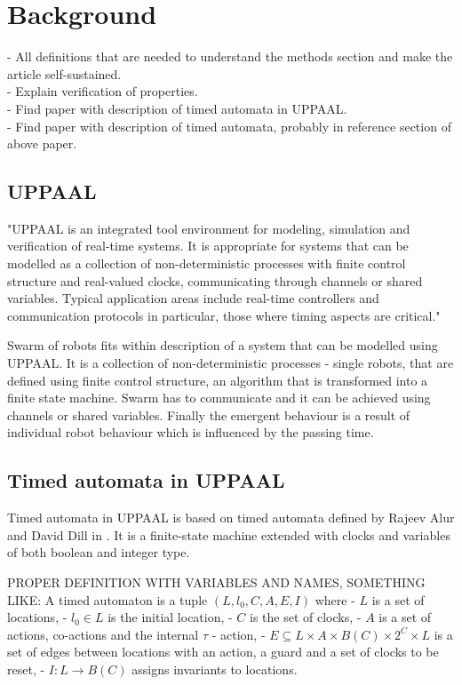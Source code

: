 \section{Background}
- All definitions that are needed to understand the methods section and make the article self-sustained. \\
- Explain verification of properties. \\
- Find paper with description of timed automata in UPPAAL. \\
- Find paper with description of timed automata, probably in reference section of above paper. \\

\subsection{UPPAAL}
"UPPAAL is an integrated tool environment for modeling, simulation and verification of real-time systems. It is appropriate for systems that can be modelled as a collection of non-deterministic processes with finite control structure and real-valued clocks, communicating through channels or shared variables. Typical application areas include real-time controllers and communication protocols in particular, those where timing aspects are critical." \cite{UPPAAL_in_a_Nutshell}

Swarm of robots fits within description of a system that can be modelled using UPPAAL. It is a collection of non-deterministic processes - single robots, that are defined using finite control structure, an algorithm that is transformed into a finite state machine. Swarm has to communicate and it can be achieved using channels or shared variables. Finally the emergent behaviour is a result of individual robot behaviour which is influenced by the passing time.


\subsection{Timed automata in UPPAAL}
Timed automata in UPPAAL is based on timed automata defined by Rajeev Alur and David Dill in \cite{Automata_For_Modeling_Real-Time_Systems}. It is a finite-state machine extended with clocks and variables of both boolean and integer type.

PROPER DEFINITION WITH VARIABLES AND NAMES, SOMETHING LIKE:
A timed automaton is a tuple $(L, l_0, C, A, E, I)$ where 
- $L$ is a set of locations, 
- $l_0 \in L$ is the initial location, 
- $C$ is the set of clocks, 
- $A$ is a set of actions, co-actions and the internal $\tau$ - action, 
- $E \subseteq L \times A \times B(C) \times 2^C \times L$ is a set of edges between locations with an action, a guard and a set of clocks to be reset,
- $I : L \rightarrow B(C)$ assigns invariants to locations.
\\\\



